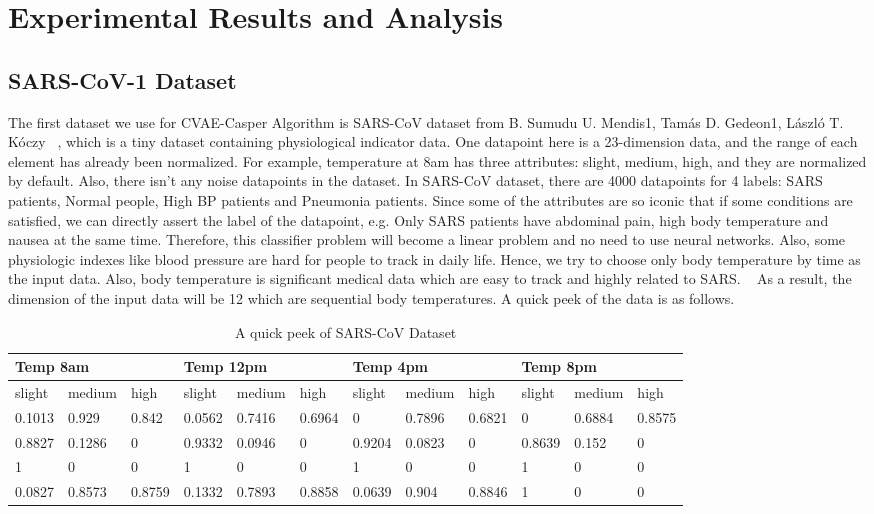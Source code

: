 \section{Experimental Results and Analysis}
\subsection{SARS-CoV-1 Dataset}
The first dataset we use for CVAE-Casper Algorithm is SARS-CoV dataset from B. Sumudu U. Mendis1, Tamás D. Gedeon1, László T. Kóczy ~\cite{dataset1_2005}, which is a tiny dataset containing physiological indicator data. One datapoint here is a 23-dimension data, and the range of each element has already been normalized. For example, temperature at 8am has three attributes: slight, medium, high, and they are normalized by default. Also, there isn’t any noise datapoints in the dataset. In SARS-CoV dataset, there are 4000 datapoints for 4 labels: SARS patients, Normal people, High BP patients and Pneumonia patients. Since some of the attributes are so iconic that if some conditions are satisfied, we can directly assert the label of the datapoint, e.g. Only SARS patients have abdominal pain, high body temperature and nausea at the same time. Therefore, this classifier problem will become a linear problem and no need to use neural networks. Also, some physiologic indexes like blood pressure are hard for people to track in daily life. Hence, we try to choose only body temperature by time as the input data. Also, body temperature is significant medical data which are easy to track and highly related to SARS. ~\cite{covidfeatures2020} As a result, the dimension of the input data will be 12 which are sequential body temperatures. A quick peek of the data is as follows.


\begin{table}
\begin{tabular}{|l|l|l|l|l|l|l|l|l|l|l|l|}
\hline
\multicolumn{3}{|l|}{Temp 8am} & \multicolumn{3}{l|}{Temp 12pm} & \multicolumn{3}{l|}{Temp 4pm} & \multicolumn{3}{l|}{Temp 8pm} \\ \hline
       slight&      medium&         high&   slight&      medium&      high&  slight&      medium&      high& slight&   medium& high             \\ \hline
       0.1013&       0.929&       0.842 &       0.0562&  0.7416&  0.6964  &       0&      0.7896&    0.6821&       0&       0.6884&   0.8575    \\ \hline
       0.8827&       0.1286&       0    &       0.9332&       0.0946&   0 &       0.9204& 0.0823&         0&       0.8639&      0.152 &  0     \\ \hline
       1&       0&                     0&       1&       0&              0&               1&       0&     0&       1&       0&       0      \\ \hline
       0.0827&       0.8573&       0.8759&       0.1332&       0.7893&       0.8858& 0.0639& 0.904&  0.8846&       1&       0&       0\\ \hline
\end{tabular}
\caption{A quick peek of SARS-CoV Dataset}
\end{table}





